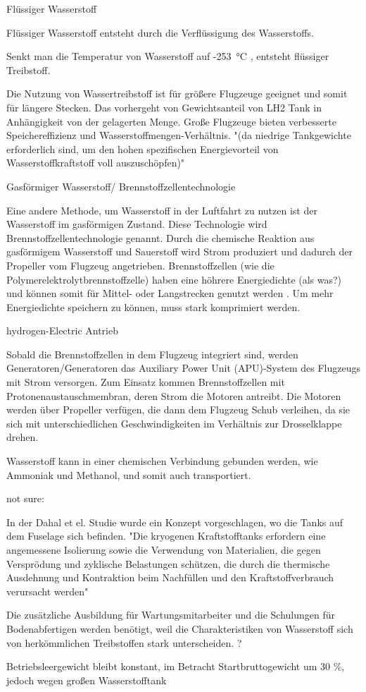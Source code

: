 Flüssiger Wasserstoff

Flüssiger Wasserstoff entsteht durch die Verflüssigung des Wasserstoffs.

Senkt man die Temperatur von Wasserstoff auf -253 °C \cite{colpan2022fuel}, entsteht flüssiger Treibstoff.

Die Nutzung von Wassertreibstoff ist für größere Flugzeuge geeignet und somit für längere Stecken. Das vorhergeht von %
Gewichtsanteil von LH2 Tank in Anhängigkeit von der gelagerten Menge. 
Große Flugzeuge bieten verbesserte Speichereffizienz und Wasserstoffmengen-Verhältnis.
"(da niedrige Tankgewichte erforderlich sind, um den hohen spezifischen Energievorteil von Wasserstoffkraftstoff voll auszuschöpfen)"
\cite{ansell2023review}


Gasförmiger Wasserstoff/ Brennstoffzellentechnologie

Eine andere Methode, um Wasserstoff in der Luftfahrt zu nutzen ist der Wasserstoff im gasförmigen Zustand. 
Diese Technologie wird Brennstoffzellentechnologie genannt.
Durch die chemische Reaktion aus gasförmigem Wasserstoff  und Sauerstoff  wird Strom produziert \cite{dalmia2022powering} und 
dadurch der Propeller vom Flugzeug angetrieben.
Brennstoffzellen (wie die Polymerelektrolytbrennstoffzelle) haben eine höhrere Energiedichte (als was?) und 
können somit für Mittel- oder Langstrecken genutzt werden \cite{dalmia2022powering}. 
Um mehr Energiedichte speichern zu können, muss  stark komprimiert werden. 

hydrogen-Electric Antrieb

Sobald die Brennstoffzellen in dem Flugzeug integriert sind, werden Generatoren/Generatoren das 
Auxiliary Power Unit (APU)-System des Flugzeugs mit Strom versorgen. Zum Einsatz kommen Brennstoffzellen 
mit Protonenaustauschmembran, deren Strom die Motoren antreibt. Die Motoren werden über Propeller verfügen,
die dann dem Flugzeug Schub verleihen, da sie sich mit unterschiedlichen Geschwindigkeiten im Verhältnis zur Drosselklappe drehen.\cite{dalmia2022powering}

Wasserstoff kann in einer chemischen Verbindung gebunden werden, wie Ammoniak und Methanol, und somit auch transportiert.

not sure:

\cite{dahal2021techno} In der Dahal et el. Studie wurde ein Konzept vorgeschlagen, wo die Tanks auf dem Fuselage sich befinden.
"Die kryogenen Kraftstofftanks erfordern eine angemessene Isolierung sowie die Verwendung von Materialien, die 
gegen Versprödung und zyklische Belastungen schützen, die durch die thermische Ausdehnung und Kontraktion beim Nachfüllen 
und den Kraftstoffverbrauch verursacht werden"

Die zusätzliche Ausbildung für Wartungsmitarbeiter und die Schulungen für Bodenabfertigen
werden benötigt, weil die Charakteristiken von Wasserstoff 
sich von herkömmlichen Treibstoffen stark unterscheiden. \cite{mulder2019outlook}?

Betriebsleergewicht bleibt konstant, im Betracht Startbruttogewicht um 30 \%, jedoch wegen großen Wasserstofftank

